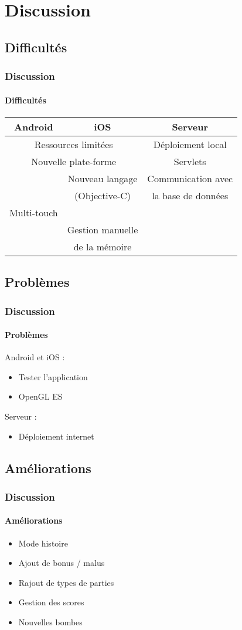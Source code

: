 \section{Discussion}

	\subsection{Difficultés}
		\begin{frame}
			\frametitle{Discussion}
			\framesubtitle{Difficultés}
				\begin{tabular}{|c|c|c|}
					Android 			 & iOS 					& Serveur \\\hline
					\multicolumn{2}{|c|}{Ressources limitées} 	& Déploiement local\\	
					\multicolumn{2}{|c|}{Nouvelle plate-forme}	& Servlets \\
										 & Nouveau langage  	& Communication avec \\
										 & (Objective-C) 		& la base de données\\
					 Multi-touch		 & 						& \\
						  				 & Gestion manuelle 	& \\
						  				 & de la mémoire 		& \\
			\end{tabular}
		\end{frame}
		
		
	\subsection{Problèmes}
		\begin{frame}
			\frametitle{Discussion}
			\framesubtitle{Problèmes}
			Android et iOS :
			\begin{itemize}
				\item Tester l'application
				\item OpenGL ES
			\end{itemize}
			
			Serveur :
			\begin{itemize}
				\item Déploiement internet
			\end{itemize}
						
		\end{frame}
		
		
	\subsection{Améliorations}
		\begin{frame}
			\frametitle{Discussion}
			\framesubtitle{Améliorations}
			\begin{itemize}
				\item Mode histoire
				\item Ajout de bonus / malus
				\item Rajout de types de parties
				\item Gestion des scores
				\item Nouvelles bombes
			\end{itemize}
		\end{frame}
